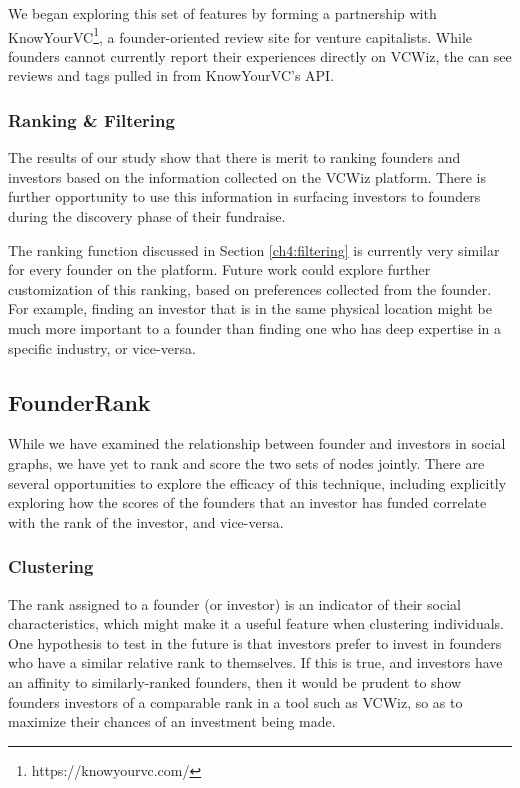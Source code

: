 We began exploring this set of features by forming a partnership with KnowYourVC\footnote{https://knowyourvc.com/}, a founder-oriented review site for venture capitalists. While founders cannot currently report their experiences directly on VCWiz, the can see reviews and tags pulled in from KnowYourVC's API.

\subsubsection{Ranking \& Filtering}

The results of our study show that there is merit to ranking founders and investors based on the information collected on the VCWiz platform. There is further opportunity to use this information in surfacing investors to founders during the discovery phase of their fundraise.

The ranking function discussed in Section \ref{ch4:filtering} is currently very similar for every founder on the platform. Future work could explore further customization of this ranking, based on preferences collected from the founder. For example, finding an investor that is in the same physical location might be much more important to a founder than finding one who has deep expertise in a specific industry, or vice-versa.

\subsection{FounderRank}

While we have examined the relationship between founder and investors in social graphs, we have yet to rank and score the two sets of nodes jointly. There are several opportunities to explore the efficacy of this technique, including explicitly exploring how the scores of the founders that an investor has funded correlate with the rank of the investor, and vice-versa.

\subsubsection{Clustering}

The rank assigned to a founder (or investor) is an indicator of their social characteristics, which might make it a useful feature when clustering individuals. One hypothesis to test in the future is that investors prefer to invest in founders who have a similar relative rank to themselves. If this is true, and investors have an affinity to similarly-ranked founders, then it would be prudent to show founders investors of a comparable rank in a tool such as VCWiz, so as to maximize their chances of an investment being made.

